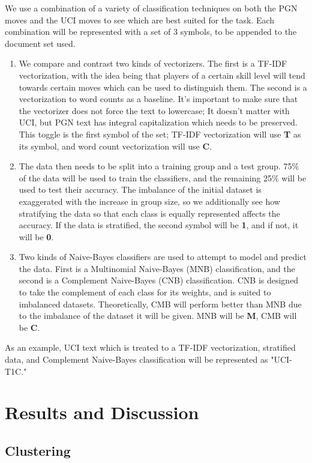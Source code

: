 \documentclass[conference]{IEEEtran}
\begin{document}
We use a combination of a variety of classification techniques on both the PGN moves and the UCI moves to see which are best suited for the task. Each combination will be represented with a set of 3 symbols, to be appended to the document set used.
\begin{enumerate}
\item We compare and contrast two kinds of vectorizers. The first is a TF-IDF vectorization, with the idea being that players of a certain skill level will tend towards certain moves which can be used to distinguish them. The second is a vectorization to word counts as a baseline. It's important to make sure that the vectorizer does not force the text to lowercase; It doesn't matter with UCI, but PGN text has integral capitalization which needs to be preserved. This toggle is the first symbol of the set; TF-IDF vectorization will use \textbf{T} as its symbol, and word count vectorization will use \textbf{C}.
\item The data then needs to be split into a training group and a test group. 75\% of the data will be used to train the classifiers, and the remaining 25\% will be used to test their accuracy. The imbalance of the initial dataset is exaggerated with the increase in group size, so we additionally see how stratifying the data so that each class is equally represented affects the accuracy. If the data is stratified, the second symbol will be \textbf{1}, and if not, it will be \textbf{0}.
\item Two kinds of Naive-Bayes classifiers are used to attempt to model and predict the data. First is a Multinomial Naive-Bayes (MNB) classification, and the second is a Complement Naive-Bayes (CNB) classification. CNB is designed to take the complement of each class for its weights, and is suited to imbalanced datasets. Theoretically, CMB will perform better than MNB due to the imbalance of the dataset it will be given. MNB will be \textbf{M}, CMB will be \textbf{C}.
\end{enumerate}

As an example, UCI text which is treated to a TF-IDF vectorization, stratified data, and Complement Naive-Bayes classification will be represented as "UCI-T1C."

\section{Results and Discussion}

\subsection{Clustering}
\end{document}
